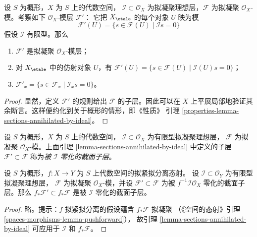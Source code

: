 \begin{lemma}
\label{lemma-sections-annihilated-by-ideal}
设 $S$ 为概形，$X$ 为 $S$ 上的代数空间，
$\mathcal{I} \subset \mathcal{O}_X$ 为拟凝聚理想层，$\mathcal{F}$ 为拟凝聚
$\mathcal{O}_X$-模。考察如下 $\mathcal{O}_X$-模层 $\mathcal{F}'$：
它把 $X_\etale$ 的每个对象 $U$ 映为模
$$
\mathcal{F}'(U)
=
\{s \in \mathcal{F}(U) \mid
\mathcal{I}s = 0\}
$$
假设 $\mathcal{I}$ 有限型。那么
\begin{enumerate}
\item $\mathcal{F}'$ 是拟凝聚 $\mathcal{O}_X$-模层；
\item 对 $X_\etale$ 中的仿射对象 $U$，有
$\mathcal{F}'(U) = \{s \in \mathcal{F}(U) \mid \mathcal{I}(U)s = 0\}$；
\item $\mathcal{F}'_x = \{s \in \mathcal{F}_x \mid \mathcal{I}_x s = 0\}$。
\end{enumerate}
\end{lemma}

\begin{proof}
显然，定义 $\mathcal{F}'$ 的规则给出 $\mathcal{F}$ 的子层。因此可以在
$X$ 上平展局部地验证其余断言。这样便约化到关于概形的情形，即《性质》
引理 \ref{properties-lemma-sections-annihilated-by-ideal}。
\end{proof}

\begin{definition}
\label{definition-subsheaf-sections-annihilated-by-ideal}
设 $S$ 为概形，$X$ 为 $S$ 上的代数空间，
$\mathcal{I} \subset \mathcal{O}_X$ 为有限型拟凝聚理想层，
$\mathcal{F}$ 为拟凝聚 $\mathcal{O}_X$-模。上面引理
\ref{lemma-sections-annihilated-by-ideal} 中定义的子层
$\mathcal{F}' \subset \mathcal{F}$ 称为{\it 被 $\mathcal{I}$ 零化的截面子层}。
\end{definition}

\begin{lemma}
\label{lemma-push-sections-annihilated-by-ideal}
设 $S$ 为概形，$f : X \to Y$ 为 $S$ 上代数空间的拟紧拟分离态射。
设 $\mathcal{I} \subset \mathcal{O}_Y$ 为有限型拟凝聚理想层，
$\mathcal{F}$ 为拟凝聚 $\mathcal{O}_X$-模，并设
$\mathcal{F}' \subset \mathcal{F}$ 为被
$f^{-1}\mathcal{I}\mathcal{O}_X$ 零化的截面子层。那么
$f_*\mathcal{F}' \subset f_*\mathcal{F}$ 是被 $\mathcal{I}$ 零化的截面子层。
\end{lemma}

\begin{proof}
略。提示：$f$ 拟紧拟分离的假设蕴含 $f_*\mathcal{F}$ 拟凝聚
（《空间的态射》引理 \ref{spaces-morphisms-lemma-pushforward}），
故引理 \ref{lemma-sections-annihilated-by-ideal} 可应用于
$\mathcal{I}$ 和 $f_*\mathcal{F}$。
\end{proof}


